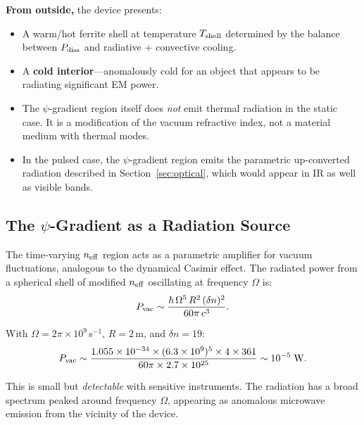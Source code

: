 \documentclass[11pt]{article}
\newcommand{\neff}{n_{\rm eff}}
\begin{document}
\begin{tcolorbox}[colback=red!5,colframe=red!50!black,title=Thermal Prediction]
\textbf{From outside,} the device presents:
\begin{itemize}[noitemsep]
\item A warm/hot ferrite shell at temperature $T_{\rm shell}$ determined by
  the balance between $P_{\rm diss}$ and radiative + convective cooling.
\item A \textbf{cold interior}---anomalously cold for an object that
  appears to be radiating significant EM power.
\item The $\psi$-gradient region itself does \emph{not} emit thermal
  radiation in the static case. It is a modification of the vacuum
  refractive index, not a material medium with thermal modes.
\item In the pulsed case, the $\psi$-gradient region emits the parametric
  up-converted radiation described in Section~\ref{sec:optical}, which
  would appear in IR as well as visible bands.
\end{itemize}
\end{tcolorbox}

\subsection{The $\psi$-Gradient as a Radiation Source}

The time-varying $\neff$ region acts as a parametric amplifier for vacuum
fluctuations, analogous to the dynamical Casimir effect. The radiated
power from a spherical shell of modified $\neff$ oscillating at frequency
$\Omega$ is:
\begin{equation}\label{eq:dyn-casimir}
P_{\rm vac} \sim \frac{\hbar\,\Omega^5\,R^2\,(\delta n)^2}{60\pi\,c^3}.
\end{equation}

With $\Omega = 2\pi \times 10^9$\,s$^{-1}$, $R = 2$\,m, and
$\delta n = 19$:
\begin{equation}
P_{\rm vac} \sim \frac{1.055 \times 10^{-34} \times (6.3 \times 10^9)^5
  \times 4 \times 361}{60\pi \times 2.7 \times 10^{25}}
  \sim 10^{-5}\;\text{W}.
\end{equation}

This is small but \emph{detectable} with sensitive instruments. The
radiation has a broad spectrum peaked around frequency $\Omega$,
appearing as anomalous microwave emission from the vicinity of the device.


\end{document}
